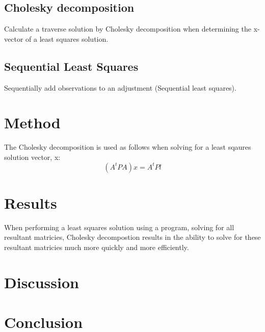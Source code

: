 \documentclass{article}
\begin{document}
\subsection{Cholesky decomposition}
Calculate a traverse solution by Cholesky decomposition when determining the x-vector of a least squares solution.

\subsection{Sequential Least Squares}
Sequentially add observations to an adjustment (Sequential least squares).

\section{Method}
The Cholesky decomposition is used as follows when solving for a least sqaures solution vector, x: 
\[ (A^t P A)x = A^t P l \]

\section{Results}
When performing a least squares solution using a program, solving for all resultant matricies, Cholesky decompostion results
in the ability to solve for these resultant matricies much more quickly and more efficiently.

\section{Discussion}

\section{Conclusion}
\end{document}
